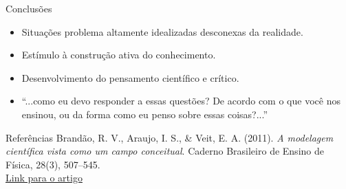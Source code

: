 \documentclass{beamer}
\begin{document}
\begin{frame}{Conclusões}
\begin{itemize}
    \item Situações problema altamente idealizadas desconexas da realidade.
    \item Estímulo à construção ativa do conhecimento.
    \item Desenvolvimento do pensamento científico e crítico.
\end{itemize}
\vspace{2em}
\begin{itemize}
    \item ``...como eu devo responder a essas questões? De acordo com o que você nos ensinou, ou da forma como eu penso sobre essas coisas?...''
\end{itemize}
\end{frame}

\begin{frame}{Referências}
Brandão, R. V., Araujo, I. S., \& Veit, E. A. (2011). \textit{A modelagem científica vista como um campo conceitual}. Caderno Brasileiro de Ensino de Física, 28(3), 507–545. \\
\href{https://periodicos.ufsc.br/index.php/fisica/article/view/2175-7941.2011v28n3p507}{Link para o artigo}
\end{frame}

\end{document}
